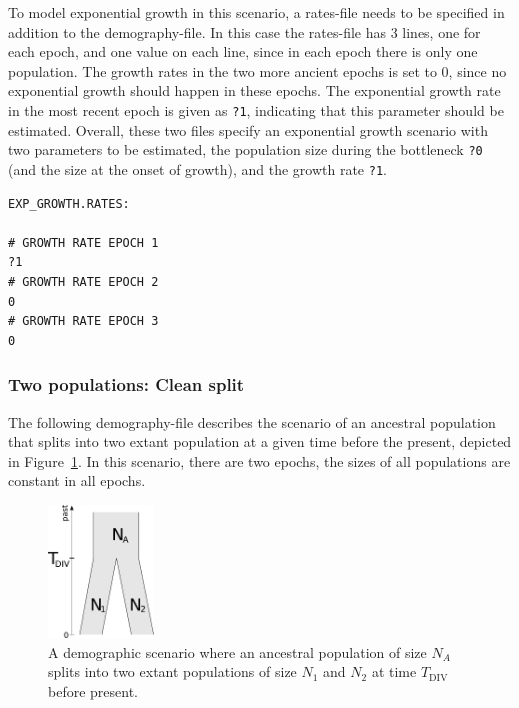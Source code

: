 \documentclass{article}
\numberwithin{equation}{section}
\begin{document}
To model exponential growth in this scenario, a rates-file needs to be specified in addition to the demography-file. In this case the rates-file has 3 lines, one for each epoch, and one value on each line, since in each epoch there is only one population. The growth rates in the two more ancient epochs is set to 0, since no exponential growth should happen in these epochs. The exponential growth rate in the most recent epoch is given as \texttt{?1}, indicating that this parameter should be estimated. Overall, these two files specify an exponential growth scenario with two parameters to be estimated, the population size during the bottleneck \texttt{?0} (and the size at the onset of growth), and the growth rate \texttt{?1}.

\begin{verbatim}
EXP_GROWTH.RATES:

# GROWTH RATE EPOCH 1
?1
# GROWTH RATE EPOCH 2
0
# GROWTH RATE EPOCH 3
0
\end{verbatim}

\subsubsection{Two populations: Clean split}
\label{sec_demo_clean_split}


The following demography-file describes the scenario of an ancestral population that splits into two extant population at a given time before the present, depicted in Figure~\ref{fig_clean_split}. In this scenario, there are two epochs, the sizes of all populations are constant in all epochs.

\begin{figure}
  \begin{center}
    \includegraphics[width=0.25\textwidth]{graphics/cleanSplit.pdf}
  \end{center} 
  \caption{A demographic scenario where an ancestral population of size $N_A$ splits into two extant populations of size $N_1$ and $N_2$ at time $T_\text{DIV}$ before present.}
  \label{fig_clean_split}
\end{figure}
\end{document}
